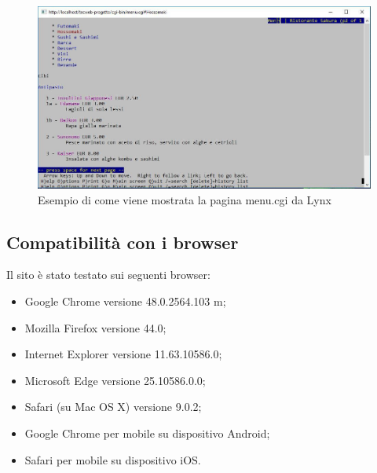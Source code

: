 \documentclass[../relazione.tex]{subfiles}
\begin{document}
		\begin{figure}[H]
			\centering
			\includegraphics[width=\textwidth]{images/lynx2}
			\caption{Esempio di come viene mostrata la pagina menu.cgi da Lynx}
			\label{fig:Esempio di come viene mostrata la pagina menu.cgi da Lynx}
		\end{figure}
		
	\subsection{Compatibilità con i browser}
	Il sito è stato testato sui seguenti browser:
	\begin{itemize}
		\item Google Chrome versione 48.0.2564.103 m;
		\item Mozilla Firefox versione 44.0;
		\item Internet Explorer versione 11.63.10586.0;
		\item Microsoft Edge versione 25.10586.0.0;
		\item Safari (su Mac OS X) versione 9.0.2;
		\item Google Chrome per mobile su dispositivo Android;
		\item Safari per mobile su dispositivo iOS.
	\end{itemize}

		
\end{document}
